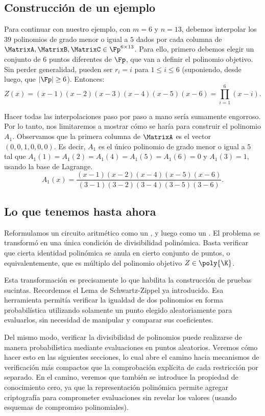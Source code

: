 \subsection{Construcción de un ejemplo}

Para continuar con nuestro ejemplo, con $m = 6$ y $n = 13$, debemos interpolar los $39$ polinomios de grado menor o igual a $5$ dados por cada columna de $\MatrixA,\MatrixB,\MatrixC \in \Fp^{6 \times 13}$. Para ello, primero debemos elegir un conjunto de $6$ puntos diferentes de $\Fp$, que van a definir el polinomio objetivo. Sin perder generalidad, pueden ser $r_i = i$ para $1 \leq i \leq 6$ (suponiendo, desde luego, que $|\Fp| \geq 6$). Entonces:
$$Z(x) = (x - 1)(x - 2)(x - 3)(x - 4)(x - 5)(x - 6) = \prod_{i=1}^{6} (x - i).$$

Hacer todas las interpolaciones paso por paso a mano sería sumamente engorroso. Por lo tanto, nos limitaremos a mostrar cómo se haría para construir el polinomio $A_1$. Observamos que la primera columna de $\MatrixA$ es el vector $(0, 0, 1, 0, 0, 0)$. Es decir, $A_1$ es el único polinomio de grado menor o igual a $5$ tal que $A_1(1) = A_1(2) = A_1(4) = A_1(5) = A_1(6) = 0$ y $A_1(3) = 1$, usando la base de Lagrange.
$$A_1(x) = \frac{(x - 1)(x - 2)(x - 4)(x - 5)(x - 6)}{(3 - 1)(3 - 2)(3 - 4)(3 - 5)(3 - 6)}.$$

\subsection{Lo que tenemos hasta ahora}

Reformulamos un circuito aritmético como un \ROneCS, y luego como un \QAP. El problema se transformó en una única condición de divisibilidad polinómica. Basta verificar que cierta identidad polinómica se anula en cierto conjunto de puntos, o equivalentemente, que es múltiplo del polinomio objetivo $Z \in \poly{\K}$.

Esta transformación es precisamente lo que habilita la construcción de pruebas sucintas. Recordemos el Lema de Schwartz-Zippel ya introducido. Esa herramienta permitía verificar la igualdad de dos polinomios en forma probabilística utilizando solamente un punto elegido aleatoriamente para evaluarlos, sin necesidad de manipular y comparar sus coeficientes.

Del mismo modo, verificar la divisibilidad de polinomios puede realizarse de manera probabilística mediante evaluaciones en puntos aleatorios. Veremos cómo hacer esto en las siguientes secciones, lo cual abre el camino hacia mecanismos de verificación más compactos que la comprobación explícita de cada restricción por separado. En el camino, veremos que también se introduce la propiedad de conocimiento cero, ya que la representación polinómica permite agregar criptografía para comprometer evaluaciones sin revelar los valores (usando esquemas de compromiso polinomiales).
